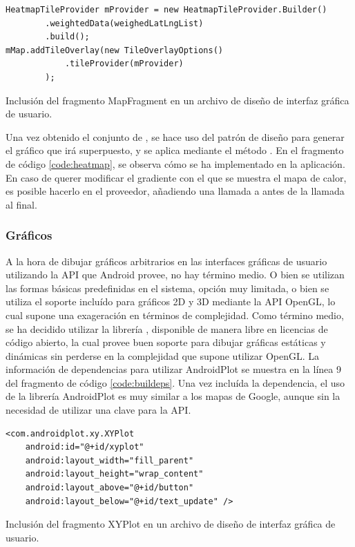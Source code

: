 \begin{listing}[h] 
\begin{verbatim}
HeatmapTileProvider mProvider = new HeatmapTileProvider.Builder()
        .weightedData(weighedLatLngList)
        .build();
mMap.addTileOverlay(new TileOverlayOptions()
            .tileProvider(mProvider)
        );
\end{verbatim}
\caption{Inclusión del fragmento MapFragment en un archivo de diseño de interfaz gráfica de usuario.}
\label{code:heatmap}
\end{listing}

    Una vez obtenido el conjunto de , se hace uso del patrón de diseño   para generar el gráfico que irá superpuesto, y se aplica mediante el método . En el fragmento de código \ref{code:heatmap}, se observa cómo se ha implementado en la aplicación. En caso de querer modificar el gradiente con el que se muestra el mapa de calor, es posible hacerlo en el proveedor, añadiendo una llamada a  antes de la llamada al  final.

\subsubsection{Gráficos}
    A la hora de dibujar gráficos arbitrarios en las interfaces gráficas de usuario utilizando la API que Android provee, no hay término medio. O bien se utilizan las formas básicas predefinidas en el sistema, opción muy limitada, o bien se utiliza el soporte incluído para gráficos 2D y 3D mediante la API OpenGL, lo cual supone una exageración en términos de complejidad. Como término medio, se ha decidido utilizar la librería , disponible de manera libre en licencias de código abierto, la cual provee buen soporte para dibujar gráficas estáticas y dinámicas sin perderse en la complejidad que supone utilizar OpenGL.
    La información de dependencias para utilizar AndroidPlot se muestra en la línea 9 del fragmento de código \ref{code:buildeps}. Una vez incluída la dependencia, el uso de la librería AndroidPlot es muy similar a los mapas de Google, aunque sin la necesidad de utilizar una clave para la API. 
            
\begin{listing}[h] 
\begin{verbatim}
<com.androidplot.xy.XYPlot
    android:id="@+id/xyplot"
    android:layout_width="fill_parent"
    android:layout_height="wrap_content"
    android:layout_above="@+id/button"
    android:layout_below="@+id/text_update" />
\end{verbatim}
\caption{Inclusión del fragmento XYPlot en un archivo de diseño de interfaz gráfica de usuario.}
\label{code:plotlayout}
\end{listing}

